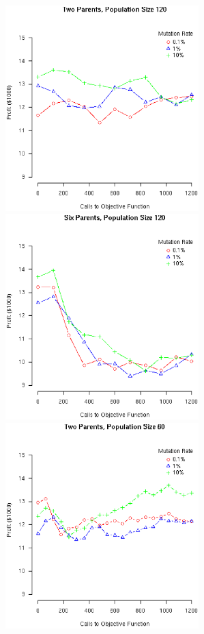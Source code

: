 \documentclass[12pt]{article}
\begin{document}
\begin{figure}[!ht]
  \begin{minipage}[b]{0.5\linewidth}
    \includegraphics[width=7.5cm]{Gen2ParentsPop120.eps}
  \end{minipage}
  \begin{minipage}[b]{0.5\linewidth}
    \includegraphics[width=7.5cm]{Gen6ParentsPop120.eps}
  \end{minipage}
  \begin{minipage}[b]{0.5\linewidth}
    \includegraphics[width=7.5cm]{Gen2ParentsPop60.eps}

\end{minipage}
\end{figure}
\end{document}
